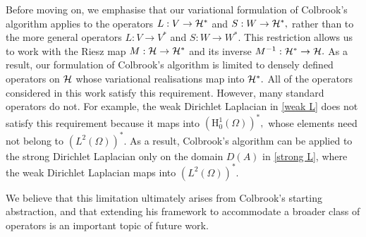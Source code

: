 

Before moving on, we emphasise that our variational formulation of Colbrook's algorithm applies to the operators $L: V \rightarrow \mathcal{H}^*$ and $S: W \rightarrow \mathcal{H}^*,$ rather than to the more general operators $L: V \rightarrow V^*$ and $S: W\rightarrow W^*.$ This restriction allows us to work with the Riesz map $M : \mathcal{H} \rightarrow \mathcal{H}^*$ and its inverse $M^{-1}:\mathcal{H}^* \rightarrow \mathcal{H}.$  As a result, our formulation of Colbrook's algorithm is limited to densely defined operators on $\mathcal{H}$ whose variational realisations map into $\mathcal{H}^*.$ All of the operators considered in this work satisfy this requirement. However, many standard operators do not. For example, the weak Dirichlet Laplacian in \eqref{weak L} does not satisfy this requirement because it maps into $(\text{H}_0^1(\Omega))^*,$ whose elements need not belong to $(L^2(\Omega))^*.$ As a result, Colbrook's algorithm can be applied to the strong Dirichlet Laplacian only on the domain $D(A)$ in \eqref{strong L}, where the weak Dirichlet Laplacian maps into $(L^2(\Omega))^*.$ 

We believe that this limitation ultimately arises from Colbrook's starting abstraction, and that extending his framework to accommodate a broader class of operators is an important topic of future work.







 

    



